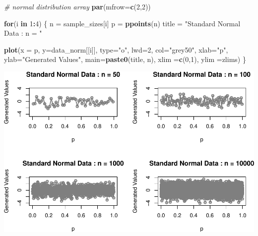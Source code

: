 \documentclass[9pt,letter]{article}
\newenvironment{Shaded}{\begin{snugshade}}{\end{snugshade}}
\newcommand{\KeywordTok}[1]{\textcolor[rgb]{0.13,0.29,0.53}{\textbf{#1}}}
\newcommand{\DataTypeTok}[1]{\textcolor[rgb]{0.13,0.29,0.53}{#1}}
\newcommand{\DecValTok}[1]{\textcolor[rgb]{0.00,0.00,0.81}{#1}}
\newcommand{\StringTok}[1]{\textcolor[rgb]{0.31,0.60,0.02}{#1}}
\newcommand{\CommentTok}[1]{\textcolor[rgb]{0.56,0.35,0.01}{\textit{#1}}}
\newcommand{\ControlFlowTok}[1]{\textcolor[rgb]{0.13,0.29,0.53}{\textbf{#1}}}
\newcommand{\OperatorTok}[1]{\textcolor[rgb]{0.81,0.36,0.00}{\textbf{#1}}}
\newcommand{\NormalTok}[1]{#1}
\begin{document}
\begin{Shaded}
\begin{Highlighting}[]
\CommentTok{# normal distribution array}
\KeywordTok{par}\NormalTok{(}\DataTypeTok{mfrow=}\KeywordTok{c}\NormalTok{(}\DecValTok{2}\NormalTok{,}\DecValTok{2}\NormalTok{))}

\ControlFlowTok{for}\NormalTok{(i }\ControlFlowTok{in} \DecValTok{1}\OperatorTok{:}\DecValTok{4}\NormalTok{) \{}
\NormalTok{  n =}\StringTok{ }\NormalTok{sample_sizes[i]}
\NormalTok{  p =}\StringTok{ }\KeywordTok{ppoints}\NormalTok{(n)}
\NormalTok{  title =}\StringTok{ "Standard Normal Data : n = "}
  
  \KeywordTok{plot}\NormalTok{(}\DataTypeTok{x =}\NormalTok{ p, }\DataTypeTok{y=}\NormalTok{data_norm[[i]], }
      \DataTypeTok{type=}\StringTok{"o"}\NormalTok{, }\DataTypeTok{lwd=}\DecValTok{2}\NormalTok{, }\DataTypeTok{col=}\StringTok{"grey50"}\NormalTok{,}
      \DataTypeTok{xlab=}\StringTok{"p"}\NormalTok{, }\DataTypeTok{ylab=}\StringTok{"Generated Values"}\NormalTok{,}
      \DataTypeTok{main=}\KeywordTok{paste0}\NormalTok{(title, n),}
      \DataTypeTok{xlim =}\KeywordTok{c}\NormalTok{(}\DecValTok{0}\NormalTok{,}\DecValTok{1}\NormalTok{), }\DataTypeTok{ylim =}\NormalTok{zlims)}
\NormalTok{\}}
\end{Highlighting}
\end{Shaded}

\includegraphics{a3_solutions_files/figure-latex/unnamed-chunk-7-1.pdf}
\end{document}
